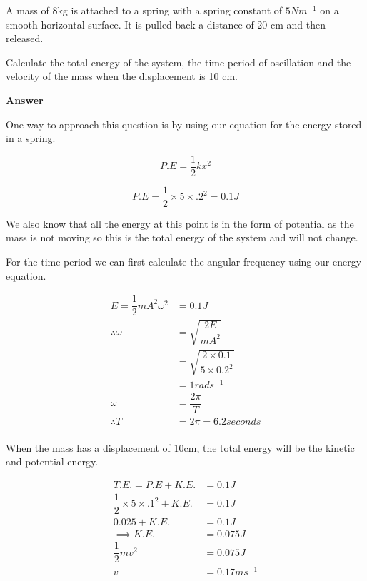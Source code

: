 \documentclass[revision-guide.tex]{subfiles}
\begin{document}
\begin{example}

A mass of 8kg is attached to a spring with a spring constant of $5 Nm^{-1}$ on a smooth horizontal surface.
It is pulled back a distance of 20 cm and then released. 

Calculate the total energy of the system, the time period of oscillation and the velocity of the mass when the displacement is 10 cm.




    
\textbf{Answer}

One way to approach this question is by using our equation for the energy stored in a spring.

\[
P.E = \dfrac{1}{2}kx^2
\]

\[
P.E = \dfrac{1}{2} \times 5 \times .2^2 = 0.1J
\]

We also know that all the energy at this point is in the form of potential as the mass is not moving so this is the total energy of the system and will not change.

For the time period we can first calculate the angular frequency using our energy equation.

\begin{align*} 
E = \dfrac{1}{2}mA^2\omega^2 &= 0.1 J\\
\therefore \omega &= \sqrt{\dfrac{2 E}{m A^2}}\\
&= \sqrt{\dfrac{2 \times 0.1}{5 \times 0.2^2}}\\
&= 1 rads^{-1}\\
\omega &= \dfrac{2 \pi}{T} \\
\therefore T &= 2 \pi = 6.2 seconds \\
\end{align*}


When the mass has a displacement of 10cm, the total energy will be the kinetic and potential energy.


\begin{align*} 
T.E. = P.E + K.E. &= 0.1J \\
 \dfrac{1}{2} \times 5 \times .1^2 + K.E. &= 0.1J\\
 0.025 + K.E. &= 0.1J  \\
 \implies K.E. &= 0.075J \\
 \dfrac{1}{2}mv^2 &= 0.075J \\
 v &= 0.17 ms^{-1} \\
 \end{align*}

\end{example}
\end{document}
